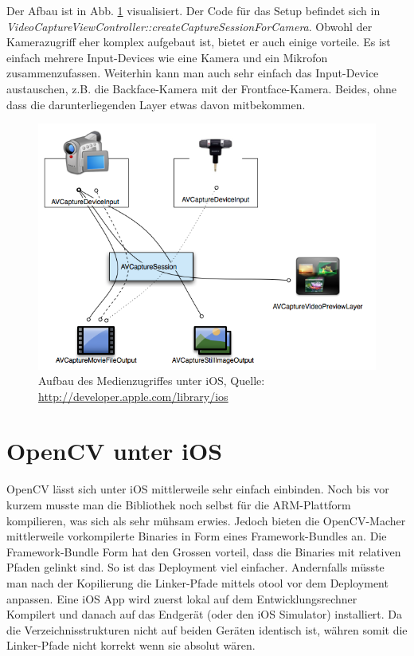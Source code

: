Der Afbau ist in Abb. \ref{fig:ios-capture-overview} visualisiert. Der Code für das Setup befindet sich in \textit{VideoCaptureViewController::createCaptureSessionForCamera}. Obwohl der Kamerazugriff eher komplex aufgebaut ist, bietet er auch einige vorteile. Es ist einfach mehrere Input-Devices wie eine Kamera und ein Mikrofon zusammenzufassen. Weiterhin kann man auch sehr einfach das Input-Device austauschen, z.B. die Backface-Kamera mit der Frontface-Kamera. Beides, ohne dass die darunterliegenden Layer etwas davon mitbekommen.

\begin{figure}[!ht]
\centering
\includegraphics[scale=0.6]{images/ios-capture-overview.png} 
\caption{Aufbau des Medienzugriffes unter iOS, Quelle: \protect\url{http://developer.apple.com/library/ios}}
\label{fig:ios-capture-overview}
\end{figure}

\section{OpenCV unter iOS}
OpenCV lässt sich unter iOS mittlerweile sehr einfach einbinden. Noch bis vor kurzem musste man die Bibliothek noch selbst für die ARM-Plattform kompilieren, was sich als sehr mühsam erwies. Jedoch bieten die OpenCV-Macher mittlerweile vorkompilerte Binaries in Form eines Framework-Bundles an. Die Framework-Bundle Form hat den Grossen vorteil, dass die Binaries mit relativen Pfaden gelinkt sind. So ist das Deployment viel einfacher. Andernfalls müsste man nach der Kopilierung die Linker-Pfade mittels otool vor dem Deployment anpassen. Eine iOS App wird zuerst lokal auf dem Entwicklungsrechner Kompilert und danach auf das Endgerät (oder den iOS Simulator) installiert. Da die Verzeichnisstrukturen nicht auf beiden Geräten identisch ist, währen somit die Linker-Pfade nicht korrekt wenn sie absolut wären.

